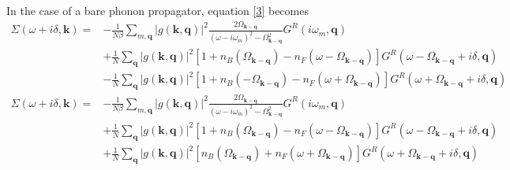 \documentclass[]{article}
\newcommand{\kk}{\mathbf{k}}
\newcommand{\qq}{\mathbf{q}}
\newcommand{\iwm}{i\omega_m}
\newcommand{\gs}{\left| g(\mathbf{k}, \mathbf{q}) \right|^2}
\begin{document}
In the case of a bare phonon propagator, equation \ref{3} becomes
\begin{equation}
\begin{split}
\Sigma(\omega+i\delta, \kk) = &-\frac{1}{N\beta} \sum_{m,\qq} \gs \frac{2\Omega_{\kk-\qq}}{(\omega-\iwm)^2-\Omega_{\kk-\qq}^2} G^R(\iwm,\qq) \\
& + \frac{1}{N} \sum_\qq \gs \left[ 1 + n_B(\Omega_{\kk-\qq}) - n_F(\omega-\Omega_{\kk-\qq})\right]G^R(\omega-\Omega_{\kk-\qq}+i\delta,\qq) \\
& - \frac{1}{N} \sum_\qq \gs \left[ 1 + n_B(-\Omega_{\kk-\qq}) - n_F(\omega+\Omega_{\kk-\qq})\right]G^R(\omega+\Omega_{\kk-\qq}+i\delta,\qq)
\end{split}
\end{equation}
\begin{equation}
\boxed{
\begin{split}
\Sigma(\omega+i\delta, \kk) = &-\frac{1}{N\beta} \sum_{m,\qq} \gs \frac{2\Omega_{\kk-\qq}}{(\omega-\iwm)^2-\Omega_{\kk-\qq}^2} G^R(\iwm,\qq) \\
& + \frac{1}{N} \sum_\qq \gs \left[ 1 + n_B(\Omega_{\kk-\qq}) - n_F(\omega-\Omega_{\kk-\qq})\right]G^R(\omega-\Omega_{\kk-\qq}+i\delta,\qq) \\
& + \frac{1}{N} \sum_\qq \gs \left[ n_B(\Omega_{\kk-\qq}) + n_F(\omega+\Omega_{\kk-\qq})\right]G^R(\omega+\Omega_{\kk-\qq}+i\delta,\qq)
\end{split}}
\end{equation}
\end{document}
